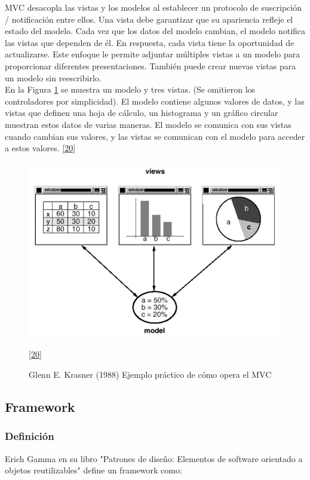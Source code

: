 MVC desacopla las vistas y los modelos al establecer un protocolo de suscripción / notificación entre ellos. Una vista debe garantizar que su apariencia refleje el estado del modelo. Cada vez que los datos del modelo cambian, el modelo notifica las vistas que dependen de él. En respuesta, cada vista tiene la oportunidad de actualizarse. Este enfoque le permite adjuntar múltiples vistas a un modelo para proporcionar diferentes presentaciones. También puede crear nuevas vistas para un modelo sin reescribirlo.\\

En la Figura \ref{fig:mvc2} se muestra un modelo y tres vistas. (Se omitieron los controladores por simplicidad). El modelo contiene algunos valores de datos, y las vistas que definen una hoja de cálculo, un histograma y un gráfico circular muestran estos datos de varias maneras. El modelo se comunica con sus vistas cuando cambian sus valores, y las vistas se comunican con el modelo para acceder a estos valores. \hyperlink{b20}{[20]} 

\begin{figure}[H]
	\begin{center}
		\includegraphics[width=.65\textwidth]{images/marcoteorico/mvc2}
		\caption{Glenn E. Krasner (1988) Ejemplo práctico de cómo opera el MVC}
		\hyperlink{b20}{[20]} 
		\label{fig:mvc2}
	\end{center}
\end{figure}

\subsection{Framework}

\subsubsection{Definición}

Erich Gamma en su libro "Patrones de diseño: Elementos de software orientado a objetos reutilizables" define un framework como:\\ 

